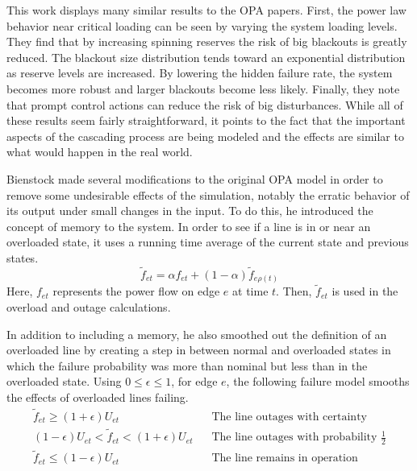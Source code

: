 This work displays many similar results to the OPA papers.  First, the power law behavior near critical loading can be seen by varying the system loading levels.  They find that by increasing spinning reserves the risk of big blackouts is greatly reduced.  The blackout size distribution tends toward an exponential distribution as reserve levels are increased.  By lowering the hidden failure rate, the system becomes more robust and larger blackouts become less likely.  Finally, they note that prompt control actions can reduce the risk of big disturbances.  While all of these results seem fairly straightforward, it points to the fact that the important aspects of the cascading process are being modeled and the effects are similar to what would happen in the real world.

Bienstock made several modifications \cite{bienstock_2011} to the original OPA model in order to remove some undesirable effects of the simulation, notably the erratic behavior of its output under small changes in the input.  To do this, he introduced the concept of memory to the system.  In order to see if a line is in or near an overloaded state, it uses a running time average of the current state and previous states.
\begin{equation}
\tilde{f}_{et} = \alpha f_{et} + (1-\alpha) \tilde{f}_{e\rho(t)}
\end{equation} 
Here, $f_{et}$ represents the power flow on edge $e$ at time $t$.  Then, $\tilde{f}_{et}$ is used in the overload and outage calculations.

In addition to including a memory, he also smoothed out the definition of an overloaded line by creating a step in between normal and overloaded states in which the failure probability was more than nominal but less than in the overloaded state.  Using $0 \le \epsilon \le 1$, for edge $e$, the following failure model smooths the effects of overloaded lines failing.
\begin{align}
\tilde{f}_{et} \ge (1+\epsilon) U_{et}			&	\hspace{10pt} \mbox{The line outages with certainty} 	\\
(1-\epsilon) U_{et} < \tilde{f}_{et} < (1+\epsilon) U_{et}	&	\hspace{10pt} \mbox{The line outages with probability }\frac{1}{2} 	\\
\tilde{f}_{et} \le (1-\epsilon) U_{et}			&	\hspace{10pt} \mbox{The line remains in operation} 
\end{align}

